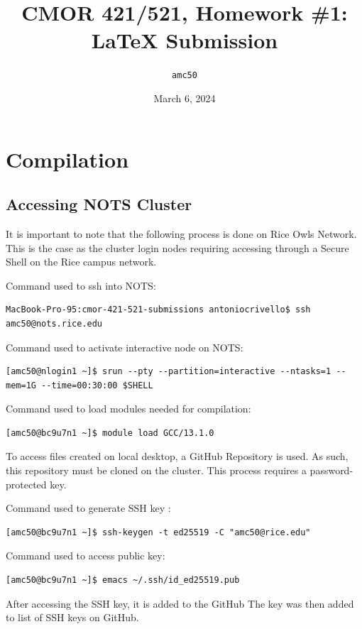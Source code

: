\documentclass{article}
\title{CMOR 421/521, Homework \#1: \LaTeX{} Submission}
\author{\texttt{amc50}}
\date{March 6, 2024}
\begin{document}
\maketitle

\section{Compilation}

\subsection{Accessing NOTS Cluster}
It is important to note that the following process is done on Rice Owls Network. This is the case as the cluster login nodes requiring accessing through a Secure Shell on the Rice campus network.

\bigskip
\noindent Command used to ssh into NOTS:

\begin{verbatim}
MacBook-Pro-95:cmor-421-521-submissions antoniocrivello$ ssh amc50@nots.rice.edu
\end{verbatim}

\bigskip
\noindent Command used to activate interactive node on NOTS:
\begin{verbatim}
[amc50@nlogin1 ~]$ srun --pty --partition=interactive --ntasks=1 --mem=1G --time=00:30:00 $SHELL
\end{verbatim}

\bigskip
\noindent Command used to load modules needed for compilation:
\begin{verbatim}
[amc50@bc9u7n1 ~]$ module load GCC/13.1.0 
\end{verbatim}

\bigskip
\noindent To access files created on local desktop, a GitHub Repository is used. As such, this repository must be cloned on the cluster. This process requires a password-protected key.

\bigskip
\noindent Command used to generate SSH key :
\begin{verbatim}
[amc50@bc9u7n1 ~]$ ssh-keygen -t ed25519 -C "amc50@rice.edu"
\end{verbatim}

\bigskip
\noindent Command used to access public key:
\begin{verbatim}
[amc50@bc9u7n1 ~]$ emacs ~/.ssh/id_ed25519.pub 
\end{verbatim}

\bigskip
\noindent After accessing the SSH key, it is added to the GitHub The key was then added to list of SSH keys on GitHub.
\end{document}
